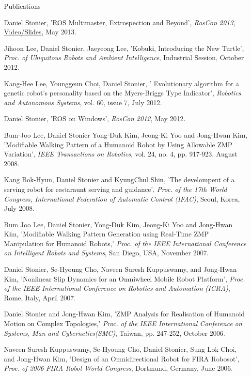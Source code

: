 \documentclass[a4paper,10pt]{article}
\begin{document}
\begin{cvsection}{Publications}
  \begin{djs_itemize}
    \item Daniel Stonier, 'ROS Multimaster, Extrospection and Beyond', \textit{RosCon 2013}, \href{http://vimeo.com/67806889}{Video/Slides}, May 2013.
    \item Jihoon Lee, Daniel Stonier, Jaeyeong Lee, 'Kobuki, Introducing the New Turtle', \textit{Proc. of Ubiquitous Robots and Ambient Intelligence}, Industrial Session, October 2012.
    \item Kang-Hee Lee, Younggeun Choi, Daniel Stonier, '
Evolutionary algorithm for a genetic robot's personality based on the Myers-Briggs Type Indicator', \textit{Robotics and Autonomous Systems}, vol. 60, issue 7, July 2012.
    \item Daniel Stonier, 'ROS on Windows', \textit{RosCon 2012}, May 2012.
    \item Bum-Joo Lee, Daniel Stonier Yong-Duk Kim, Jeong-Ki Yoo and Jong-Hwan Kim, 'Modifiable Walking Pattern of a Humanoid Robot by Using Allowable ZMP Variation', \textit{IEEE Transactions on Robotics}, vol. 24, no. 4, pp. 917-923, August 2008.
    \item Kang Bok-Hyun, Daniel Stonier and KyungChul Shin, 'The develompent of a serving robot for restaraunt serving and guidance', \textit{Proc. of the 17th World Congress, International Federation of Automatic Control (IFAC)}, Seoul, Korea, July 2008.
    \item Bum Joo Lee, Daniel Stonier, Yong-Duk Kim, Jeong-Ki Yoo and Jong-Hwan Kim, 'Modifiable Walking Pattern Generation using Real-Time ZMP Manipulation for Humanoid Robots,' \textit{Proc. of the IEEE International Conference on Intelligent Robots and Systems}, San Diego, USA, November 2007.
    \item Daniel Stonier, Se-Hyoung Cho, Naveen Suresh Kuppuswamy, and Jong-Hwan Kim, 'Nonlinear Slip Dynamics for an Omniwheel Mobile Robot Platform', \textit{Proc. of the IEEE International Conference on Robotics and
Automation (ICRA)}, Rome, Italy, April 2007.
    \item Daniel Stonier and Jong-Hwan Kim, 'ZMP Analysis for Realisation of Humanoid Motion on Complex Topologies,' \textit{Proc.  of the IEEE International Conference on Systems, Man and Cybernetics(SMC)}, Taiwan, pp. 247-252, October 2006.
    \item Naveen Suresh Kuppuswamy, Se-Hyoung Cho, Daniel Stonier, Sung Lok Choi, and Jong-Hwan Kim, 'Design of an Omnidirectional Robot for FIRA Robosot', \textit{Proc. of 2006 FIRA Robot World Congress}, Dortmund, Germany, June 2006.

\end{djs_itemize}
\end{cvsection}
\end{document}
